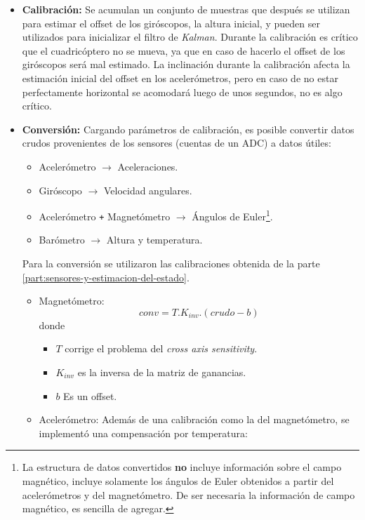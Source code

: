 \documentclass[main]{subfiles}
\begin{document}
\begin{itemize}
\item \textbf{Calibración:} Se acumulan un conjunto de muestras que después se utilizan para estimar el offset de los giróscopos, la altura inicial, y pueden ser utilizados para inicializar el filtro de \textit{Kalman}. Durante la calibraci\'on es cr\'itico que el cuadric\'optero no se mueva, ya que en caso de hacerlo el offset de los gir\'oscopos ser\'a mal estimado.\newline
La inclinaci\'on durante la calibraci\'on afecta la estimaci\'on inicial del offset en los aceler\'ometros, pero en caso de no estar perfectamente horizontal se acomodar\'a luego de unos segundos, no es algo cr\'itico.
\item \textbf{Conversión:} Cargando parámetros de calibración, es posible convertir datos crudos provenientes de los sensores (cuentas de un ADC) a datos útiles:
  \begin{itemize}
  \item Aceler\'ometro $\rightarrow$ Aceleraciones.
  \item Gir\'oscopo $\rightarrow$ Velocidad angulares.
  \item Aceler\'ometro \verb~+~ Magnet\'ometro  $\rightarrow$ \'Angulos de Euler\footnote{La estructura de datos convertidos \textbf{no} incluye informaci\'on sobre el campo magn\'etico, incluye solamente los \'angulos de Euler obtenidos a partir del aceler\'ometros y del magnet\'ometro. De ser necesaria la informaci\'on de campo magn\'etico, es sencilla de agregar.}.
  \item Bar\'ometro $\rightarrow$ Altura y temperatura.
  \end{itemize}
Para la conversi\'on se utilizaron las calibraciones obtenida de la parte \ref{part:sensores-y-estimacion-del-estado}.
\begin{itemize}
\item Magnet\'ometro:
  \begin{equation}
    \label{eq:software:calib-lineal}
    conv = T.K_{inv}.(crudo - b)
  \end{equation}
  donde
  \begin{itemize}
  \item $T$ corrige el problema del \textit{cross axis sensitivity}.
  \item $K_{inv}$ es la inversa de la matriz de ganancias.
  \item $b$ Es un offset.
  \end{itemize}
\item Aceler\'ometro: Adem\'as de una calibraci\'on como la del magnet\'ometro, se implement\'o una compensaci\'on por temperatura:

\end{itemize}
\end{itemize}
\end{document}
